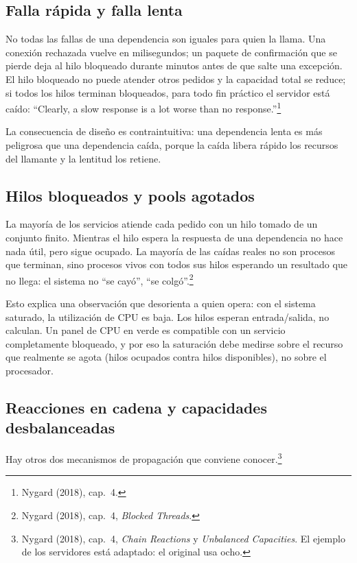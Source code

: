 \documentclass[variant=apuntes,cover=institutional,mode=screen]{ua-engineering-v6-article}
\begin{document}
\subsection{Falla rápida y falla lenta}

No todas las fallas de una dependencia son iguales para quien la llama. Una conexión rechazada vuelve en milisegundos; un paquete de confirmación que se pierde deja al hilo bloqueado durante minutos antes de que salte una excepción. El hilo bloqueado no puede atender otros pedidos y la capacidad total se reduce; si todos los hilos terminan bloqueados, para todo fin práctico el servidor está caído: ``Clearly, a slow response is a lot worse than no response.''\footnote{Nygard (2018), cap.~4.}

La consecuencia de diseño es contraintuitiva: una dependencia lenta es más peligrosa que una dependencia caída, porque la caída libera rápido los recursos del llamante y la lentitud los retiene.

\subsection{Hilos bloqueados y pools agotados}

La mayoría de los servicios atiende cada pedido con un hilo tomado de un conjunto finito. Mientras el hilo espera la respuesta de una dependencia no hace nada útil, pero sigue ocupado. La mayoría de las caídas reales no son procesos que terminan, sino procesos vivos con todos sus hilos esperando un resultado que no llega: el sistema no ``se cayó'', ``se colgó''.\footnote{Nygard (2018), cap.~4, \emph{Blocked Threads}.}

Esto explica una observación que desorienta a quien opera: con el sistema saturado, la utilización de CPU es baja. Los hilos esperan entrada/salida, no calculan. Un panel de CPU en verde es compatible con un servicio completamente bloqueado, y por eso la saturación debe medirse sobre el recurso que realmente se agota (hilos ocupados contra hilos disponibles), no sobre el procesador.

\subsection{Reacciones en cadena y capacidades desbalanceadas}

Hay otros dos mecanismos de propagación que conviene conocer.\footnote{Nygard (2018), cap.~4, \emph{Chain Reactions} y \emph{Unbalanced Capacities}. El ejemplo de los servidores está adaptado: el original usa ocho.}
\end{document}
